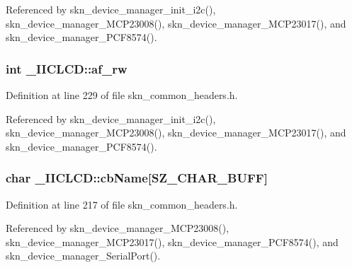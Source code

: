 Referenced by skn\+\_\+device\+\_\+manager\+\_\+init\+\_\+i2c(), skn\+\_\+device\+\_\+manager\+\_\+\+M\+C\+P23008(), skn\+\_\+device\+\_\+manager\+\_\+\+M\+C\+P23017(), and skn\+\_\+device\+\_\+manager\+\_\+\+P\+C\+F8574().

\subsubsection[{\texorpdfstring{af\+\_\+rw}{af_rw}}]{\setlength{\rightskip}{0pt plus 5cm}int \+\_\+\+I\+I\+C\+L\+C\+D\+::af\+\_\+rw}\hypertarget{struct___i_i_c_l_c_d_ad0162f6a3e82c34192c0d901ef0ff6be}{}\label{struct___i_i_c_l_c_d_ad0162f6a3e82c34192c0d901ef0ff6be}


Definition at line 229 of file skn\+\_\+common\+\_\+headers.\+h.



Referenced by skn\+\_\+device\+\_\+manager\+\_\+init\+\_\+i2c(), skn\+\_\+device\+\_\+manager\+\_\+\+M\+C\+P23008(), skn\+\_\+device\+\_\+manager\+\_\+\+M\+C\+P23017(), and skn\+\_\+device\+\_\+manager\+\_\+\+P\+C\+F8574().

\subsubsection[{\texorpdfstring{cb\+Name}{cbName}}]{\setlength{\rightskip}{0pt plus 5cm}char \+\_\+\+I\+I\+C\+L\+C\+D\+::cb\+Name\mbox{[}{\bf S\+Z\+\_\+\+C\+H\+A\+R\+\_\+\+B\+U\+FF}\mbox{]}}\hypertarget{struct___i_i_c_l_c_d_a3f9347595482a6da5cb5d536d937a554}{}\label{struct___i_i_c_l_c_d_a3f9347595482a6da5cb5d536d937a554}


Definition at line 217 of file skn\+\_\+common\+\_\+headers.\+h.



Referenced by skn\+\_\+device\+\_\+manager\+\_\+\+M\+C\+P23008(), skn\+\_\+device\+\_\+manager\+\_\+\+M\+C\+P23017(), skn\+\_\+device\+\_\+manager\+\_\+\+P\+C\+F8574(), and skn\+\_\+device\+\_\+manager\+\_\+\+Serial\+Port().

